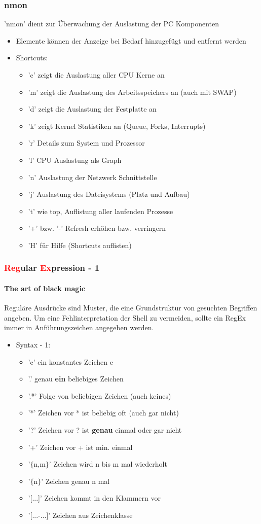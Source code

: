 \documentclass[12pt,utf8]{beamer}
\begin{document}
\begin{frame}
\frametitle{nmon}
'nmon' dient zur Überwachung der Auslastung der PC Komponenten
\begin{itemize}
	\item Elemente können der Anzeige bei Bedarf hinzugefügt und entfernt werden
	\item Shortcuts:
	\begin{itemize}[<+->]
		\item 'c' zeigt die Auslastung aller CPU Kerne an
		\item 'm' zeigt die Auslastung des Arbeitsspeichers an (auch mit SWAP)
		\item 'd' zeigt die Auslastung der Festplatte an
		\item 'k' zeigt Kernel Statistiken an (Queue, Forks, Interrupts)
		\item 'r' Details zum System und Prozessor
		\item 'l' CPU Auslastung als Graph
		\item 'n' Auslastung der Netzwerk Schnittstelle
		\item 'j' Auslastung des Dateisystems (Platz und Aufbau)
		\item 't' wie top, Auflistung aller laufenden Prozesse
		\item '+' bzw. '-' Refresh erhöhen bzw. verringern
		\item 'H' für Hilfe (Shortcuts auflisten)
	\end{itemize}
\end{itemize}
\end{frame}

\begin{frame}
\frametitle{\textcolor{red}{Reg}ular \textcolor{red}{Ex}pression - 1}
\framesubtitle{The art of black magic}
Reguläre Ausdrücke sind Muster, die eine Grundstruktur von gesuchten Begriffen angeben. Um eine Fehlinterpretation der Shell zu vermeiden, sollte ein RegEx immer in Anführungszeichen angegeben werden.
\begin{itemize}
	\item Syntax - 1:
	\begin{itemize}[<+->]
		\item 'c' ein konstantes Zeichen c
		\item '.' genau \textbf{ein} beliebiges Zeichen
		\item '.*' Folge von beliebigen Zeichen (auch keines)
		\item '*' Zeichen vor * ist beliebig oft (auch gar nicht)
		\item '?' Zeichen vor ? ist \textbf{genau} einmal oder gar nicht
		\item '+' Zeichen vor + ist min. einmal
		\item '$\{$n,m$\}$' Zeichen wird n bis m mal wiederholt
		\item '$\{$n$\}$' Zeichen genau n mal
		\item '[...]' Zeichen kommt in den Klammern vor
		\item '[...-...]' Zeichen aus Zeichenklasse
		
	\end{itemize}
\end{itemize}
\end{frame}
\end{document}

